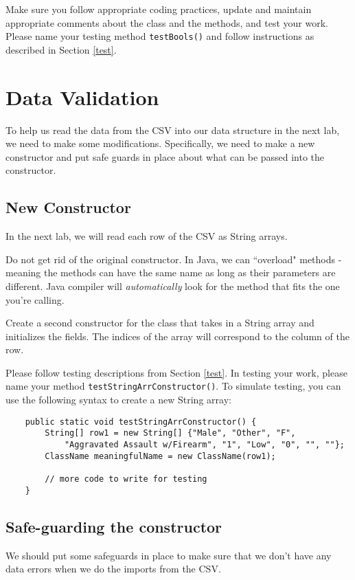 \documentclass[12pt]{article}
\begin{document}
Make sure you follow appropriate coding practices, update and maintain appropriate comments about the class and the methods, and test your work.  Please name your testing method \texttt{testBools()} and follow instructions as described in Section \ref{test}.

\section{Data Validation}
To help us read the data from the CSV into our data structure in the next lab, we need to make some modifications. Specifically, we need to make a new constructor and put safe guards in place about what can be passed into the constructor.

\subsection{New Constructor}
In the next lab, we will read each row of the CSV as String arrays.

Do not get rid of the original constructor. In Java, we can ``overload" methods - meaning the methods can have the same name as long as their parameters are different.  Java compiler will \emph{automatically} look for the method that fits the one you're calling.

Create a second constructor for the class that takes in a String array and initializes the fields. The indices of the array will correspond to the column of the row.

Please follow testing descriptions from Section \ref{test}. In testing your work, please name your method \texttt{testStringArrConstructor()}.
To simulate testing, you can use the following syntax to create a new String array:
\begin{verbatim}
    public static void testStringArrConstructor() {
        String[] row1 = new String[] {"Male", "Other", "F",
            "Aggravated Assault w/Firearm", "1", "Low", "0", "", ""};
        ClassName meaningfulName = new ClassName(row1);
        
        // more code to write for testing
    }
\end{verbatim}

\subsection{Safe-guarding the constructor}
We should put some safeguards in place to make sure that we don't have any data errors when we do the imports from the CSV.
\end{document}
